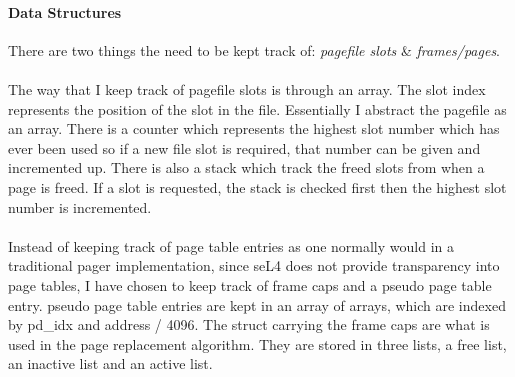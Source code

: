 \documentclass{article}
\begin{document}
\paragraph{Data Structures}
There are two things the need to be kept track of: \textit{pagefile slots} \& \textit{frames/pages}.\\\\
The way that I keep track of pagefile slots is through an array. The slot index represents the position of the slot in the file. Essentially I abstract the pagefile as an array. There is a counter which represents the highest slot number which has ever been used so if a new file slot is required, that number can be given and incremented up. There is also a stack which track the freed slots from when a page is freed. If a slot is requested, the stack is checked first then the highest slot number is incremented.
\\\\
Instead of keeping track of page table entries as one normally would in a traditional pager implementation, since seL4 does not provide transparency into page tables, I have chosen to keep track of frame caps and a pseudo page table entry. pseudo page table entries are kept in an array of arrays, which are indexed by pd\_idx and address / 4096. The struct carrying the frame caps are what is used in the page replacement algorithm. They are stored in three lists, a free list, an inactive list and an active list.
\end{document}
